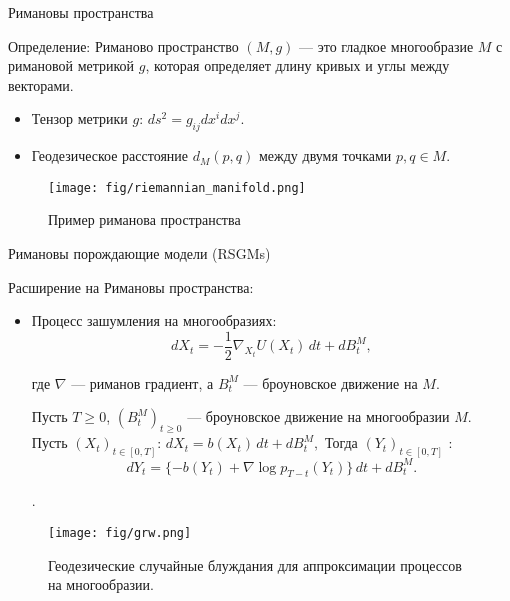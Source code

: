 \documentclass{beamer}
\begin{document}
\begin{frame}{Римановы пространства} 
 
\begin{block}{Определение:} 
Риманово пространство \((M, g)\) — это гладкое многообразие \(M\) с римановой метрикой \(g\), которая определяет длину кривых и углы между векторами. 
\end{block} 
 
\begin{itemize} 
    \item Тензор метрики \(g\): \(ds^2 = g_{ij} dx^i dx^j\). 
    \item Геодезическое расстояние \(d_M(p, q)\) между двумя точками \(p, q \in M\). 
\end{itemize} 
 
\begin{figure}[H] 
\centering 
\texttt{[image: fig/riemannian\_manifold.png]} 
\caption{Пример риманова пространства} 
\label{fig:riemannian_space} 
\end{figure} 
 
\end{frame} 
\begin{frame}{Римановы порождающие модели (RSGMs)} 
 
\begin{block}{Расширение на Римановы пространства:} 
\begin{itemize} 
    \item Процесс зашумления на многообразиях: \[
dX_t = -\frac{1}{2} \nabla_{X_t} U(X_t) \, dt + dB_t^M, \tag{3}
\]

где $\nabla$ — риманов градиент, а $B_t^M$ — броуновское движение на $M$. 
    \begin{theorem}
\label{thm:time_reversed_diffusion}
Пусть $T \geq 0$, $(B_t^M)_{t \geq 0}$ — броуновское движение на многообразии $M$. Пусть $(X_t)_{t \in [0, T]}$:
\(dX_t = b(X_t) \, dt + dB_t^M,\)
Тогда $(Y_t)_{t \in [0, T]}$ :
\[
dY_t = \{-b(Y_t) + \nabla \log p_{T-t}(Y_t)\} \, dt + dB_t^M. \tag{4}
\]
\end{theorem}. 
\end{itemize} 
\end{block} 
 
\begin{figure}[H] 
\centering 
\texttt{[image: fig/grw.png]} 
\caption{Геодезические случайные блуждания для аппроксимации процессов на многообразии.} 
\label{fig:geodesic_rw} 
\end{figure} 
 
\end{frame} 
\end{document}
